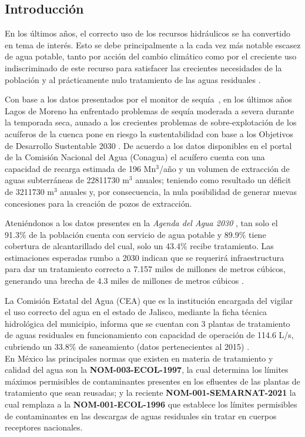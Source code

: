 \subsection*{Introducción}
En los últimos años, el correcto uso de los recursos hidráulicos se ha convertido en tema de interés. Esto se debe principalmente a la cada vez más notable escasez de agua potable, tanto por acción del cambio climático como por el creciente uso indiscriminado de este recurso para satisfacer las crecientes necesidades de la población y al prácticamente nulo tratamiento de las aguas residuales \citep{informeods2021, aa2030}.\par
Con base a los datos presentados por el monitor de sequía~\citep{msm}, en los últimos años Lagos de Moreno ha enfrentado problemas de sequía moderada a severa durante la temporada seca, aunado a los crecientes problemas de sobre-explotación de los acuíferos de la cuenca pone en riesgo la sustentabilidad con base a los Objetivos de Desarrollo Sustentable 2030 \citep{aa2030}. De acuerdo a los datos disponibles en el portal de la Comisión Nacional del Agua (Conagua) \citep{acuiferolag} el acuífero cuenta con una capacidad de recarga estimada de 196 Mn$^{3}$/año y un volumen de extracción de aguas subterráneas de 22811730 m$^{3}$ anuales; teniendo como resultado un déficit de 3211730 m$^{3}$ anuales y, por consecuencia, la nula posibilidad de generar nuevas concesiones para la creación de pozos de extracción.\par
Ateniéndonos a los datos presentes en la \emph{Agenda del Agua 2030} \citep{aa2030}, tan solo el 91.3\% de la población cuenta con servicio de agua potable y 89.9\% tiene cobertura de alcantarillado del cual, solo un 43.4\% recibe tratamiento. Las estimaciones esperadas rumbo a 2030 indican que se requerirá infraestructura para dar un tratamiento correcto a 7.157 miles de millones de metros cúbicos, generando una brecha de 4.3 miles de millones de metros cúbicos \citep{aa2030}.\par
La Comisión Estatal del Agua (CEA) que es la institución encargada del vigilar el uso correcto del agua en el estado de Jalisco, mediante la ficha técnica hidrológica del municipio, informa que se cuentan con 3 plantas de tratamiento de aguas residuales  en funcionamiento con capacidad de operación de 114.6 L/s, cubriendo un 33.8\% de saneamiento (datos pertenecientes al 2015) \citep{fichalagos}.\\
En México las principales normas que existen en materia de tratamiento y calidad del agua son la \textbf{NOM-003-ECOL-1997}, la cual determina los límites máximos permisibles de contaminantes presentes en los efluentes de las plantas de tratamiento que sean reusadas; y la reciente \textbf{NOM-001-SEMARNAT-2021} la cual remplaza a la \textbf{NOM-001-ECOL-1996} que establece los límites permisibles de contaminantes en las descargas de aguas residuales sin tratar en cuerpos receptores nacionales.


